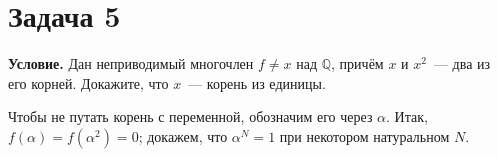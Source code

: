 \documentclass[12pt]{article}
\begin{document}



	\section*{Задача 5}

	\noindent
	\textbf{Условие.} Дан неприводимый многочлен $f\ne x$ над $\mathbb{Q}$,
	причём $x$ и $x^2$~--- два из его корней. Докажите, что $x$~--- корень
	из единицы.

	\medskip
	\noindent
	Чтобы не путать корень с переменной, обозначим его через $\alpha$.
	Итак, $f(\alpha)=f(\alpha^2)=0$; докажем, что $\alpha^N=1$ при некотором
	натуральном $N$.
\end{document}
